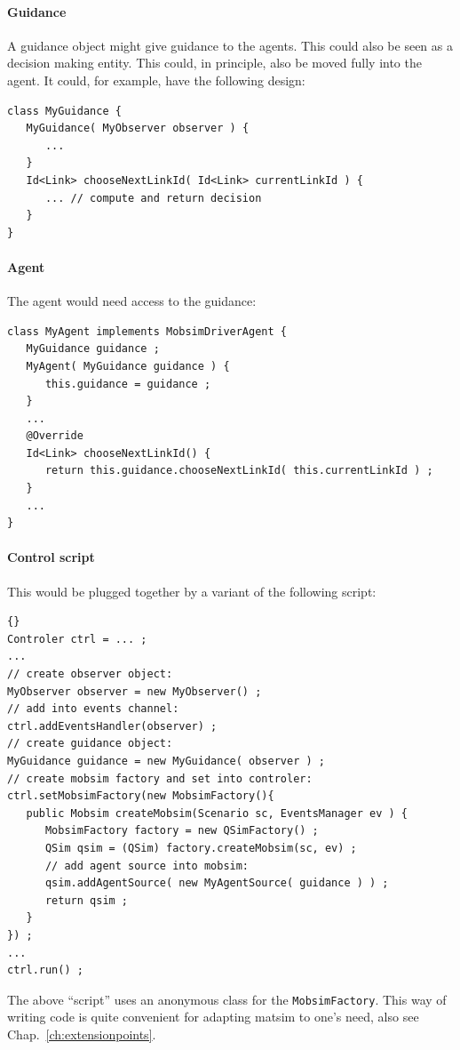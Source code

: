 \paragraph{Guidance}

A guidance object might give guidance to the agents.  This could also be seen as a decision making entity.  This could, in principle, also be moved fully into the agent.  It could, for example, have the following design:
\begin{lstlisting}
class MyGuidance {
   MyGuidance( MyObserver observer ) {
      ...
   }
   Id<Link> chooseNextLinkId( Id<Link> currentLinkId ) {
      ... // compute and return decision
   }
}
\end{lstlisting}

\paragraph{Agent}

The agent would need access to the guidance:
\begin{lstlisting}
class MyAgent implements MobsimDriverAgent {
   MyGuidance guidance ;
   MyAgent( MyGuidance guidance ) {
      this.guidance = guidance ;
   }  
   ...
   @Override
   Id<Link> chooseNextLinkId() {
      return this.guidance.chooseNextLinkId( this.currentLinkId ) ;
   }
   ...
}
\end{lstlisting}

\paragraph{Control script}

This would be plugged together by a variant of the following script:
\begin{lstlisting}[basicstyle=\footnotesize\tt]{}
Controler ctrl = ... ;
...
// create observer object:
MyObserver observer = new MyObserver() ;
// add into events channel:
ctrl.addEventsHandler(observer) ;
// create guidance object:
MyGuidance guidance = new MyGuidance( observer ) ;
// create mobsim factory and set into controler:
ctrl.setMobsimFactory(new MobsimFactory(){
   public Mobsim createMobsim(Scenario sc, EventsManager ev ) {
      MobsimFactory factory = new QSimFactory() ; 
      QSim qsim = (QSim) factory.createMobsim(sc, ev) ;
      // add agent source into mobsim:
      qsim.addAgentSource( new MyAgentSource( guidance ) ) ;
      return qsim ;
   }
}) ;
...
ctrl.run() ;
\end{lstlisting}
The above ``script'' uses an anonymous class for the \lstinline$MobsimFactory$.  This way of writing code is quite convenient for adapting \acrshort{matsim} to one's need, also see Chap.~\ref{ch:extensionpoints}.

